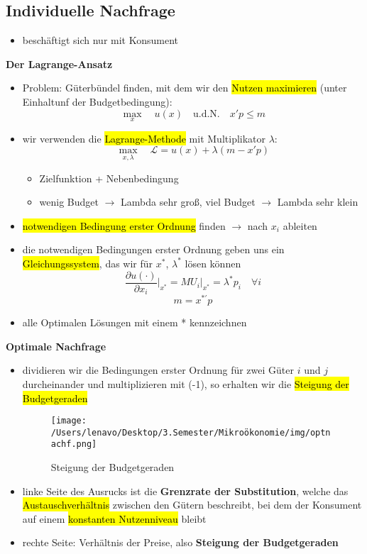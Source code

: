 \documentclass[a4paper, 10pt]{article}
\begin{document}
\subsection{Individuelle Nachfrage}
\begin{itemize}
    \item beschäftigt sich nur mit Konsument
\end{itemize}
\textbf{Der Lagrange-Ansatz}
\begin{itemize}
    \item Problem: Güterbündel finden, mit dem wir den \hl{Nutzen maximieren} (unter Einhaltunf der Budgetbedingung):
            \[
            \max_{x} \quad u(x) \quad \text{u.d.N.} \quad x'p \leq m
            \]

    \item wir verwenden die \hl{Lagrange-Methode} mit Multiplikator $\lambda$:
            \[
                \max_{x, \lambda} \quad \mathcal{L} = u(x) + \lambda(m - x'p)
            \]
            \begin{itemize}
                \item Zielfunktion + Nebenbedingung 
                \item wenig Budget $\rightarrow$ Lambda sehr groß, viel Budget $\rightarrow$ Lambda sehr klein
            \end{itemize}


    \item \hl{notwendigen Bedingung erster Ordnung} finden $\rightarrow$ nach $x_i$ ableiten
    \item die notwendigen Bedingungen erster Ordnung geben uns ein \hl{Gleichungssystem}, das wir für $x^*$, $\lambda^*$ lösen können
                \[
\frac{\partial u(\cdot)}{\partial x_i} \bigg|_{x^*} = MU_i \bigg|_{x^*} = \lambda^* p_i \quad \forall i
\]
\[
m = x^{*'} p
\]
    \item alle Optimalen Lösungen mit einem * kennzeichnen
\end{itemize}
\textbf{Optimale Nachfrage}
\begin{itemize}
    \item dividieren wir die Bedingungen erster Ordnung für zwei Güter $i$ und $j$ durcheinander und multiplizieren mit (-1), so erhalten wir die \hl{Steigung der Budgetgeraden}
    \newpage
    \begin{figure}[h]
        \centering
        \texttt{[image: /Users/lenavo/Desktop/3.Semester/Mikroökonomie/img/optnachf.png]}
        \caption{Steigung der Budgetgeraden}
        \label{fig:enter-label}
    \end{figure}

    \item linke Seite des Ausrucks ist die \textbf{Grenzrate der Substitution}, welche das \hl{Austauschverhältnis} zwischen den Gütern beschreibt, bei dem der Konsument auf einem \hl{konstanten Nutzenniveau} bleibt
    \item rechte Seite: Verhältnis der Preise, also \textbf{Steigung der Budgetgeraden} 
\end{itemize}
\end{document}

